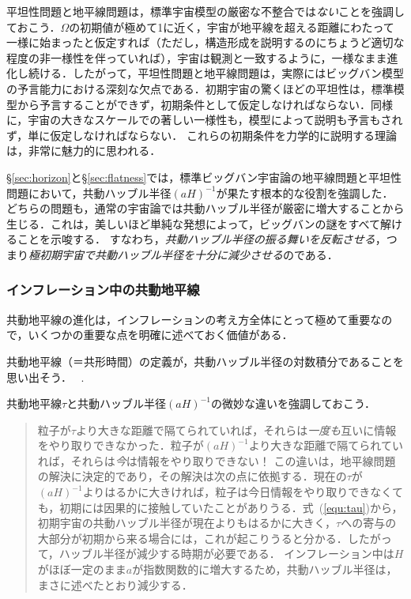 
平坦性問題と地平線問題は，標準宇宙模型の厳密な不整合では{\it ない}ことを強調しておこう．$\Omega$の初期値が極めて1に近く，宇宙が地平線を超える距離にわたって一様に始まったと仮定すれば（ただし，構造形成を説明するのにちょうど適切な程度の非一様性を伴っていれば），宇宙は観測と一致するように，一様なまま進化し続ける．したがって，平坦性問題と地平線問題は，実際にはビッグバン模型の予言能力における深刻な欠点である．初期宇宙の驚くほどの平坦性は，標準模型から予言することができず，初期条件として仮定しなければならない．同様に，宇宙の大きなスケールでの著しい一様性も，模型によって説明も予言もされず，単に仮定しなければならない．
これらの初期条件を力学的に説明する理論は，非常に魅力的に思われる．





\S\ref{sec:horizon}と\S\ref{sec:flatness}では，標準ビッグバン宇宙論の地平線問題と平坦性問題において，共動ハッブル半径$(a H)^{-1}$が果たす根本的な役割を強調した．
どちらの問題も，通常の宇宙論では共動ハッブル半径が厳密に増大することから生じる．これは，美しいほど単純な発想によって，ビッグバンの謎をすべて解けることを示唆する．
すなわち，{\it 共動ハッブル半径の振る舞いを反転させる}，つまり{\it 極初期宇宙で共動ハッブル半径を十分に減少させる}のである．

\subsubsection{インフレーション中の共動地平線}

共動地平線の進化は，インフレーションの考え方全体にとって極めて重要なので，いくつかの重要な点を明確に述べておく価値がある．

共動地平線（＝共形時間）の定義が，共動ハッブル半径の対数積分であることを思い出そう．
\beq
\label{equ:tau}
\, .
\eeq

共動地平線$\tau$と共動ハッブル半径$(aH)^{-1}$の微妙な違いを強調しておこう\cite{Dodelson}．
\begin{quote}
粒子が$\tau$より大きな距離で隔てられていれば，それらは{\it 一度も}互いに情報をやり取りできなかった．粒子が$(aH)^{-1}$より大きな距離で隔てられていれば，それらは{\it 今}は情報をやり取りできない！ この違いは，地平線問題の解決に決定的であり，その解決は次の点に依拠する．現在の$\tau$が$(aH)^{-1}$よりはるかに大きければ，粒子は今日情報をやり取りできなくても，初期には因果的に接触していたことがありうる．式~(\ref{equ:tau})から，初期宇宙の共動ハッブル半径が現在よりもはるかに大きく，$\tau$への寄与の大部分が初期から来る場合には，これが起こりうると分かる．したがって，ハッブル半径が減少する時期が必要である．
インフレーション中は$H$がほぼ一定のまま$a$が指数関数的に増大するため，共動ハッブル半径は，まさに述べたとおり減少する．
\end{quote}

